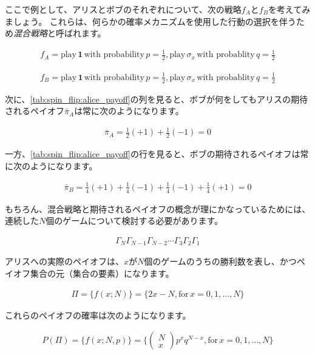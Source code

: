 ここで例として、アリスとボブのそれぞれについて、次の戦略$f_A$と$f_B$を考えてみましょう。
これらは、何らかの確率メカニズムを使用した行動の選択を伴うため\emph{混合戦略}と呼ばれます。

\begin{align}
f_A = \text{play}\, \mathbf{1}\, \text{with probability}\, p = \frac{1}{2},
    \text{play}\, \sigma_x\, \text{with probablity}\, q = \frac{1}{2}
\end{align}

\begin{align}
f_B = \text{play}\, \mathbf{1}\, \text{with probability}\, p = \frac{1}{2},
    \text{play}\, \sigma_x\, \text{with probablity}\, q = \frac{1}{2}
\end{align}

次に、\autoref{tab:spin_flip:alice_payoff}の列を見ると、ボブが何をしてもアリスの期待されるペイオフ$\bar{\pi}_A$は常に次のようになります。

\begin{align}
\bar{\pi}_A = \frac{1}{2}(+1) + \frac{1}{2}(-1) = 0
\end{align}

一方、\autoref{tab:spin_flip:alice_payoff}の行を見ると、ボブの期待されるペイオフは常に次のようになります。

\begin{align}
\bar{\pi}_B = \frac{1}{4}(+1) + \frac{1}{4}(-1) + \frac{1}{4}(-1) + \frac{1}{4}(+1) = 0
\end{align}

もちろん、混合戦略と期待されるペイオフの概念が理にかなっているためには、連続した$N$個のゲームについて検討する必要があります。

\begin{align}
\Gamma_N \Gamma_{N-1} \Gamma_{N-2} \cdots \Gamma_{3} \Gamma_{2} \Gamma_{1}  
\end{align}

アリスへの実際のペイオフは、$x$が$N$個のゲームのうちの勝利数を表し、かつペイオフ集合の元（集合の要素）になります。

\begin{align}
\Pi = \{f(x;N)\} = \{ 2x - N, \text{for}\, x = 0,1,\dots,N \} \label{eq:alice_payoff_set}
\end{align}

これらのペイオフの確率は次のようになります。

\begin{align}
P(\Pi) = \{f(x;N, p)\} = \{ 
  \left(\begin{array}{c}
    N \\
    x
  \end{array}\right) p^x q^{N-x}, \text{for}\, x = 0,1,\dots ,N
\}
\end{align}

